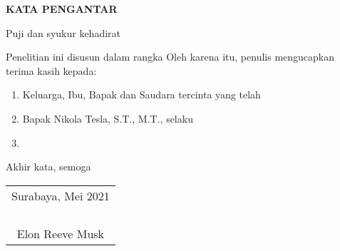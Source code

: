 \begin{center}
  \Large\textbf{KATA PENGANTAR}
\end{center}

\vspace{2ex}


Puji dan syukur kehadirat \lipsum[1][1-5]

Penelitian ini disusun dalam rangka \lipsum[2][1-5]
Oleh karena itu, penulis mengucapkan terima kasih kepada:

\begin{enumerate}[nolistsep]

  \item Keluarga, Ibu, Bapak dan Saudara tercinta yang telah \lipsum[3][1-2]

  \item Bapak Nikola Tesla, S.T., M.T., selaku \lipsum[4][1-2]

  \item \lipsum[5][1-3]

\end{enumerate}

Akhir kata, semoga \lipsum[6][1-8]

\begin{flushright}
  \begin{tabular}[b]{c}
    Surabaya, Mei 2021\\
    \\
    \\
    \\
    \\
    Elon Reeve Musk
  \end{tabular}
\end{flushright}
